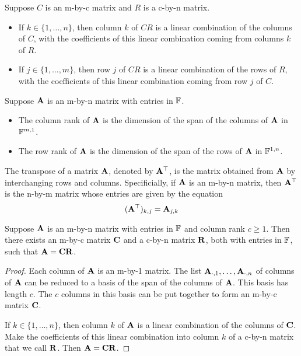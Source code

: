 \documentclass{extarticle}
\begin{document}
\begin{thm}
    Suppose \(C\) is an m-by-c matrix and \(R\) is a c-by-n matrix. 

    \begin{itemize}
        \item If \(k \in \{1, \ldots, n\}\), then column \(k\) of \(CR\) is a linear combination 
        of the columns of \(C\), with the coefficients of this linear combination coming from 
        columns \(k\) of \(R\). 
        \item If \(j \in \{1, \ldots, m\}\), then row \(j\) of \(CR\) is a linear combination of 
        the rows of \(R\), with the coefficients of this linear combination coming from row 
        \(j\) of \(C\). 
    \end{itemize}
\end{thm}


\begin{definition}
    Suppose \(\mathbf{A}\) is an m-by-n matrix with entries in \(\mathbb{F}\). 
    \begin{itemize}
        \item The column rank of \(\mathbf{A}\) is the dimension of the span of the columns of \(\mathbf{A}\)
        in \(\mathbb{F}^{m, 1}\). 
        \item The row rank of \(\mathbf{A}\) is the dimension of the span of the rows of \(\mathbf{A}\) in \(\mathbb{F}^{1, n}\). 
    \end{itemize}
\end{definition}

\begin{definition}
    The transpose of a matrix \(\mathbf{A}\), denoted by \(\mathbf{A}^\top\), is the matrix obtained from \(\mathbf{A}\)
    by interchanging rows and columns. Specificially, if \(\mathbf{A}\) is an m-by-n matrix, then 
    \(\mathbf{A}^\top\) is the n-by-m matrix whose entries are given by the equation 
    \[(\mathbf{A}^\top)_{k, j} = \mathbf{A}_{j, k}\]
\end{definition}

\begin{lemma}
    Suppose \(\mathbf{A}\) is an m-by-n matrix with entries in \(\mathbb{F}\) and column rank \(c \geq 1\). Then 
    there exists an m-by-c matrix \(\mathbf{C}\) and a c-by-n matrix \(\mathbf{R}\), both with entries in \(\mathbb{F}\), 
    such that \(\mathbf{A} = \mathbf{C} \mathbf{R}\). 
\end{lemma}

\begin{proof}
Each column of \(\mathbf{A}\) is an m-by-1 matrix. The list \(\mathbf{A}_{\cdot, 1}, \ldots, \mathbf{A}_{\cdot, n}\)
of columns of \(\mathbf{A}\) can be reduced to a basis of the span of the columns of \(\mathbf{A}\). This 
basis has length \(c\). The \(c\) columns in this basis can be put together to form an m-by-c 
matrix \(\mathbf{C}\). 

If \(k \in \{1, \ldots, n\}\), then column \(k\) of \(\mathbf{A}\) is a linear combination 
of the columns of \(\mathbf{C}\). Make the coefficients of this linear combination into column 
\(k\) of a c-by-n matrix that we call \(\mathbf{R}\). Then \(\mathbf{A} = \mathbf{C} \mathbf{R}\). 
\end{proof}
\end{document}
